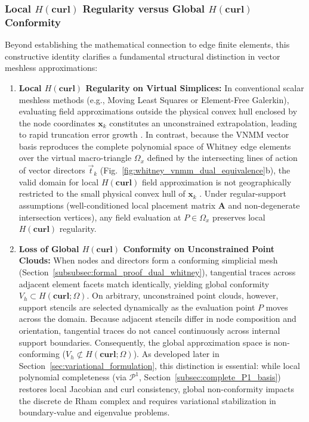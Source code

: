 \documentclass[preprint,12pt]{elsarticle}
\begin{document}
\subsubsection{Local \texorpdfstring{$H(\mathbf{curl})$}{H(curl)} Regularity versus Global \texorpdfstring{$H(\mathbf{curl})$}{H(curl)} Conformity}
Beyond establishing the mathematical connection to edge finite elements, this constructive identity clarifies a fundamental structural distinction in vector meshless approximations:
\begin{enumerate}
    \item \textbf{Local $H(\mathbf{curl})$ Regularity on Virtual Simplices:} In conventional scalar meshless methods (e.g., Moving Least Squares or Element-Free Galerkin), evaluating field approximations outside the physical convex hull enclosed by the node coordinates $\mathbf{x}_k$ constitutes an unconstrained extrapolation, leading to rapid truncation error growth \cite{lima2017edge}. In contrast, because the VNMM vector basis reproduces the complete polynomial space of Whitney edge elements over the virtual macro-triangle $\Omega_{x}$ defined by the intersecting lines of action of vector directors $\vec{t}_k$ (Fig.~\ref{fig:whitney_vnmm_dual_equivalence}b), the valid domain for local $H(\mathbf{curl})$ field approximation is not geographically restricted to the small physical convex hull of $\mathbf{x}_k$ \cite{nedelec1980mixed, monk2003finite}. Under regular-support assumptions (well-conditioned local placement matrix $\mathbf{A}$ and non-degenerate intersection vertices), any field evaluation at $P \in \Omega_{x}$ preserves local $H(\mathbf{curl})$ regularity.
    \item \textbf{Loss of Global $H(\mathbf{curl})$ Conformity on Unconstrained Point Clouds:} When nodes and directors form a conforming simplicial mesh (Section~\ref{subsubsec:formal_proof_dual_whitney}), tangential traces across adjacent element facets match identically, yielding global conformity $V_h \subset H(\mathbf{curl}; \Omega)$. On arbitrary, unconstrained point clouds, however, support stencils are selected dynamically as the evaluation point $P$ moves across the domain. Because adjacent stencils differ in node composition and orientation, tangential traces do not cancel continuously across internal support boundaries. Consequently, the global approximation space is non-conforming ($V_h \not\subset H(\mathbf{curl}; \Omega)$). As developed later in Section~\ref{sec:variational_formulation}, this distinction is essential: while local polynomial completeness (via $\mathcal{P}^1$, Section~\ref{subsec:complete_P1_basis}) restores local Jacobian and curl consistency, global non-conformity impacts the discrete de Rham complex and requires variational stabilization in boundary-value and eigenvalue problems.
\end{enumerate}
\end{document}

